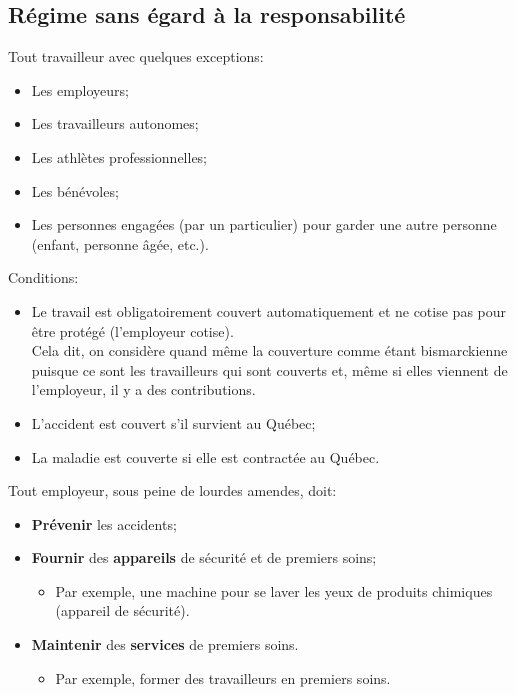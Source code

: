 \documentclass[10pt, french]{article}
\begin{document}
\begin{multicols*}{3}
\subsection*{Régime sans égard à la responsabilité}


\begin{definitionNOHFILLsub}[Couverture]
Tout travailleur avec quelques exceptions:
\begin{itemize}[leftmargin = *]
	\item	Les employeurs;
	\item	Les travailleurs autonomes;
	\item	Les athlètes professionnelles;
	\item	Les bénévoles;
	\item	Les personnes engagées (par un particulier) pour garder une autre personne (enfant, personne âgée, etc.).
\end{itemize}

Conditions:
\begin{itemize}[leftmargin = *]
	\item	Le travail est obligatoirement couvert automatiquement et ne cotise pas pour être protégé (l'employeur cotise).\\
			Cela dit, on considère quand même la couverture comme étant bismarckienne puisque ce sont les travailleurs qui sont couverts et, même si elles viennent de l'employeur, il y a des contributions.
	\item	L'accident est couvert s'il survient au Québec;
	\item	La maladie est couverte si elle est contractée au Québec.
\end{itemize}
\end{definitionNOHFILLsub}

\begin{definitionNOHFILLsub}[Prévention]
Tout employeur, sous peine de lourdes amendes, doit:
\begin{itemize}[leftmargin = *]
	\item	\textbf{Prévenir} les accidents;
	\item	\textbf{Fournir} des \textbf{appareils} de sécurité et de premiers soins;
		\begin{itemize}[leftmargin = *]
		\item	Par exemple, une machine pour se laver les yeux de produits chimiques (appareil de sécurité).
		\end{itemize}
	\item	\textbf{Maintenir} des \textbf{services} de premiers soins.
		\begin{itemize}[leftmargin = *]
		\item	Par exemple, former des travailleurs en premiers soins.
		\end{itemize}
\end{itemize}


\end{definitionNOHFILLsub}
\end{multicols*}
\end{document}
